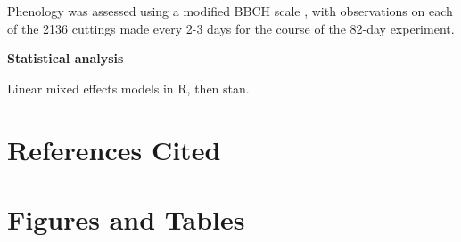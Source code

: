 \documentclass{article}
\begin{document}
Phenology was assessed using a modified BBCH scale \cite{Finn:2007}, with observations on each of the 2136 cuttings made every 2-3 days for the course of the 82-day experiment.

\textbf{Statistical analysis}

Linear mixed effects models in R, then stan.

\section*{References Cited}




\section*{Figures and Tables}
\listoftables

\listoffigures
\end{document}
